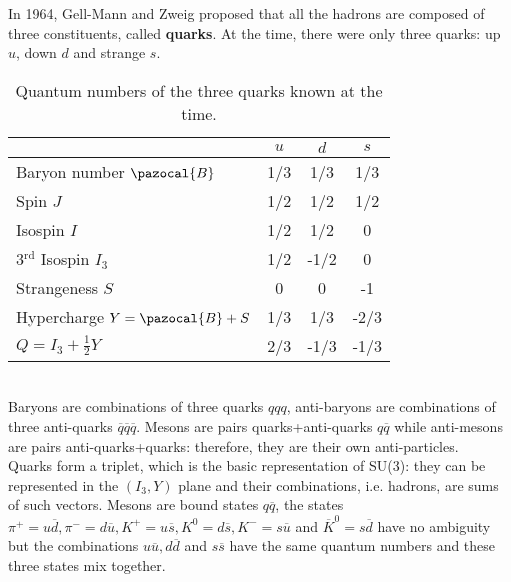 \documentclass[10.75pt,a4paper,openright,bottom=2cm]{article}
\begin{document}
In 1964, Gell-Mann and Zweig proposed that all the hadrons are composed of three constituents, called \textbf{quarks}. At the time, there were only three quarks: up $u$, down $d$ and strange $s$.
\begin{table}[h]
    \centering
    \begin{tabular}{l|ccc}
    \hline
    \cellcolor{gray!50} & \cellcolor{yellow!50}$u$ & \cellcolor{yellow!50}$d$ & \cellcolor{yellow!50}$s$\\
    \hline\hline
    \cellcolor{yellow!50}Baryon number $\pazocal{B}$ & 1/3 & 1/3 & 1/3\\
    \hline
    \cellcolor{yellow!50}Spin $J$ & 1/2 & 1/2 & 1/2\\
    \hline
    \cellcolor{yellow!50}Isospin $I$ & 1/2 & 1/2 & 0\\
    \hline
    \cellcolor{yellow!50}3$^{\text{rd}}$ Isospin $I_3$ & 1/2 & -1/2 & 0\\
    \hline
    \cellcolor{yellow!50}Strangeness $S$ & 0 & 0 & -1\\
    \hline
    \cellcolor{yellow!50}Hypercharge $Y=\pazocal{B}+S$ & 1/3 & 1/3 & -2/3\\
    \hline
    \cellcolor{yellow!50}$Q=I_3+\frac{1}{2}Y$ & 2/3 & -1/3 & -1/3\\
    \hline
    \end{tabular}
    \caption{Quantum numbers of the three quarks known at the time.}
    \label{3quak}
\end{table}\\
Baryons are combinations of three quarks $qqq$, anti-baryons are combinations of three anti-quarks $\overline{q}\overline{q}\overline{q}$. Mesons are pairs quarks+anti-quarks $q\overline{q}$ while anti-mesons are pairs anti-quarks+quarks: therefore, they are their own anti-particles.\\
Quarks form a triplet, which is the basic representation of SU(3): they can be represented in the $(I_3,Y)$ plane and their combinations, i.e. hadrons, are sums of such vectors. Mesons are bound states $q\overline{q}$, the states $\pi^+=u\overline{d}, \pi^-=d\overline{u}, K^+=u\overline{s}, K^0=d\overline{s}, K^-=s\overline{u}$ and $\overline{K}^0=s\overline{d}$ have no ambiguity but the combinations $u\overline{u}, d\overline{d}$ and $s\overline{s}$ have the same quantum numbers and these three states mix together. 
\end{document}
